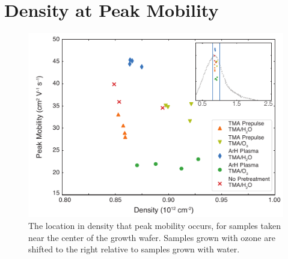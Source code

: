 \clearpage
\section{Density at Peak Mobility}
\label{sec:surf_mobden}
\begin{figure}[h]
    \includegraphics[width=0.65\linewidth]{FigureS2}
    \caption[Location in density of peak mobility]{The location in density that peak mobility occurs, for samples taken near the center of the growth wafer. Samples grown with ozone are shifted to the right relative to samples grown with water.}
    \label{fig:surf_mobden}
\end{figure}